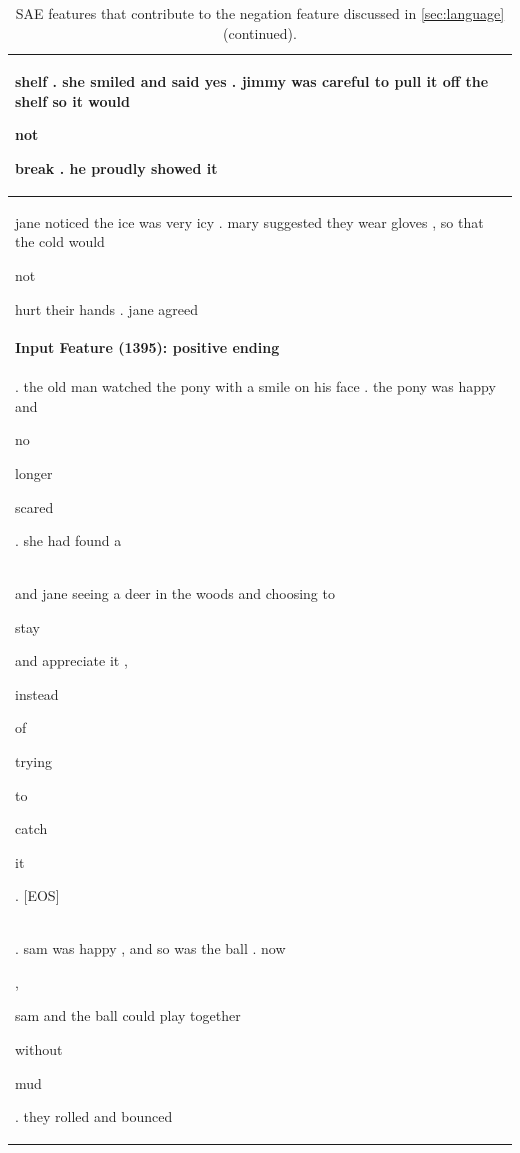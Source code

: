 \documentclass{article} %
\begin{document}
\begin{table}[h]
\begin{tabular}{|l|}
shelf . she smiled and said yes . jimmy was careful to pull it off the shelf so it would \colorbox{rgb,255:red,106;green,130;blue,166}{\strut  not} break . he proudly showed it \\ 
\hline 

jane noticed the ice was very icy . mary suggested they wear gloves , so that the cold would \colorbox{rgb,255:red,106;green,130;blue,166}{\strut  not} hurt their hands . jane agreed \\ 
\hline 

\hline
\hline
\normalsize \textbf{Input Feature (1395): positive ending} \\
\hline
. the old man watched the pony with a smile on his face . the pony was happy and \colorbox{rgb,255:red,150;green,195;blue,224}{\strut  no} \colorbox{rgb,255:red,106;green,130;blue,166}{\strut  longer} \colorbox{rgb,255:red,222;green,234;blue,245}{\strut  scared} . she had found a \\ 
\hline 

and jane seeing a deer in the woods and choosing to \colorbox{rgb,255:red,231;green,240;blue,248}{\strut  stay} and appreciate it , \colorbox{rgb,255:red,201;green,225;blue,238}{\strut  instead} \colorbox{rgb,255:red,106;green,130;blue,166}{\strut  of} \colorbox{rgb,255:red,129;green,177;blue,214}{\strut  trying} \colorbox{rgb,255:red,131;green,179;blue,215}{\strut  to} \colorbox{rgb,255:red,165;green,205;blue,229}{\strut  catch} \colorbox{rgb,255:red,205;green,226;blue,240}{\strut  it} . [EOS] \\ 
\hline 

. sam was happy , and so was the ball . now \colorbox{rgb,255:red,238;green,244;blue,250}{\strut  ,} sam and the ball could play together \colorbox{rgb,255:red,106;green,130;blue,166}{\strut  without} \colorbox{rgb,255:red,137;green,185;blue,218}{\strut  mud} . they rolled and bounced \\ 
\hline 

\hline
\end{tabular}
\caption{SAE features that contribute to the negation feature discussed in \autoref{sec:language} (continued).}
\end{table}




\end{document}
